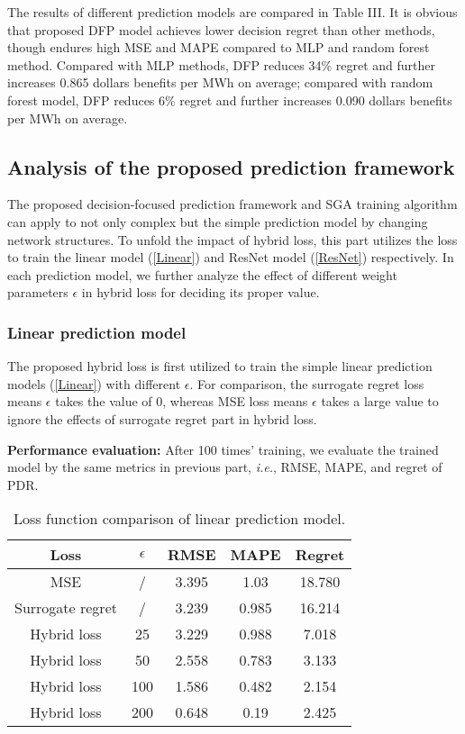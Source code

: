 \documentclass[journal]{IEEEtran}
\begin{document}
The results of different prediction models are compared in Table III. It is obvious that proposed DFP model achieves lower decision regret than other methods, though endures high MSE and MAPE compared to MLP and random forest method. Compared with MLP methods, DFP reduces 34\% regret and further increases 0.865 dollars benefits per MWh on average; compared with random forest model, DFP reduces 6\% regret and further increases 0.090 dollars benefits per MWh on average.


\subsection{Analysis of the proposed prediction framework}

The proposed decision-focused prediction framework and SGA training algorithm can apply to not only complex but the simple prediction model by changing network structures. To unfold the impact of hybrid loss, this part utilizes the loss to train the linear model (\ref{Linear}) and ResNet model (\ref{ResNet}) respectively. In each prediction model, we further analyze the effect of different weight parameters $\epsilon$ in hybrid loss for deciding its proper value. 

\subsubsection{Linear prediction model}

The proposed hybrid loss is first utilized to train the simple  linear prediction models (\ref{Linear}) with different $\epsilon$. For comparison, the surrogate regret loss means $\epsilon$ takes the value of 0, whereas MSE loss means $\epsilon$ takes a large value to ignore the effects of surrogate regret part in hybrid loss.

\textbf{Performance evaluation:}
After 100 times' training, we evaluate the trained model by the same metrics in previous part, \textit{i.e.}, RMSE, MAPE, and regret of PDR.

\begin{table}[ht]
  \renewcommand{\arraystretch}{1.3}
  \centering
  \label{linear_comparison}
  \caption{Loss function comparison of linear prediction model.}
  \begin{tabular}{ccccc}
    \hline
    Loss & $\epsilon$& RMSE & MAPE & Regret \\
    \hline
    MSE & / & 3.395 & 1.03 & 18.780 \\ 
    Surrogate regret& / & 3.239 & 0.985 & 16.214 \\
    Hybrid loss & 25 & 3.229 & 0.988 & 7.018 \\
    Hybrid loss & 50 & 2.558 & 0.783 & 3.133 \\
    Hybrid loss & 100 & 1.586 & 0.482 & 2.154 \\
    Hybrid loss & 200 & 0.648 & 0.19 & 2.425 \\
    \hline
  \end{tabular}
\end{table}
\end{document}
